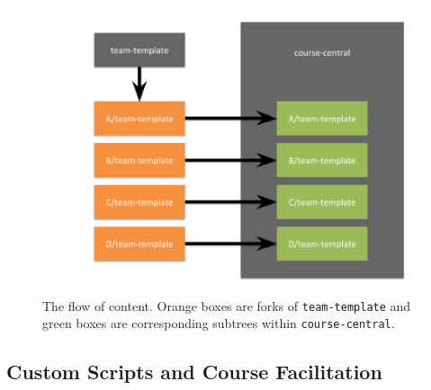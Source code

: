 \documentclass[12pt,twoside]{mitthesis}
\begin{document}
\begin{figure}[H]
\centering
\includegraphics[scale=0.4]{fig-diagram.png}
\caption{\label{fig-diagram} The flow of content. Orange boxes are forks of \texttt{team-template} and green boxes are corresponding subtrees within \texttt{course-central}.}
\end{figure}


\subsection{Custom Scripts and Course Facilitation}
\end{document}
